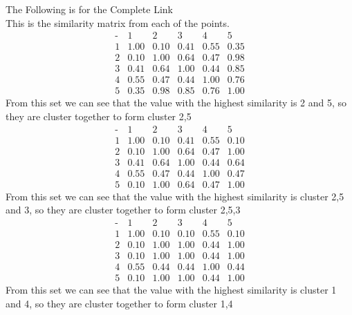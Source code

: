 \documentclass[12pt,english]{article}
\begin{document}
\par
The Following is for the Complete Link\\
This is the similarity matrix from each of the points.
\begin{equation*}
\begin{array}{c|ccccc}
\mbox{-}& 1 & 2 & 3 & 4 & 5\\
\hline
1 & 1.00 & 0.10 & 0.41 & 0.55 & 0.35 \\
2 & 0.10 & 1.00 & 0.64 & 0.47 & 0.98 \\
3 & 0.41 & 0.64 & 1.00 & 0.44 & 0.85 \\
4 & 0.55 & 0.47 & 0.44 & 1.00 & 0.76 \\
5 & 0.35 & 0.98 & 0.85 & 0.76 & 1.00 
\end{array}
\end{equation*}
From this set we can see that the value with the highest similarity is 2 and 5, so they are cluster together to form cluster 2,5\\
\begin{equation*}
\begin{array}{c|ccccc}
\mbox{-}& 1 & 2 & 3 & 4 & 5\\
\hline
1 & 1.00 & 0.10 & 0.41 & 0.55 & 0.10 \\
2 & 0.10 & 1.00 & 0.64 & 0.47 & 1.00 \\
3 & 0.41 & 0.64 & 1.00 & 0.44 & 0.64 \\
4 & 0.55 & 0.47 & 0.44 & 1.00 & 0.47 \\
5 & 0.10 & 1.00 & 0.64 & 0.47 & 1.00 
\end{array}
\end{equation*}
From this set we can see that the value with the highest similarity is cluster 2,5 and 3, so they are cluster together to form cluster 2,5,3\\
\begin{equation*}
\begin{array}{c|ccccc}
\mbox{-}& 1 & 2 & 3 & 4 & 5\\
\hline
1 & 1.00 & 0.10 & 0.10 & 0.55 & 0.10 \\
2 & 0.10 & 1.00 & 1.00 & 0.44 & 1.00 \\
3 & 0.10 & 1.00 & 1.00 & 0.44 & 1.00 \\
4 & 0.55 & 0.44 & 0.44 & 1.00 & 0.44 \\
5 & 0.10 & 1.00 & 1.00 & 0.44 & 1.00 
\end{array}
\end{equation*}
From this set we can see that the value with the highest similarity is cluster 1 and 4, so they are cluster together to form cluster 1,4\\
\end{document}
